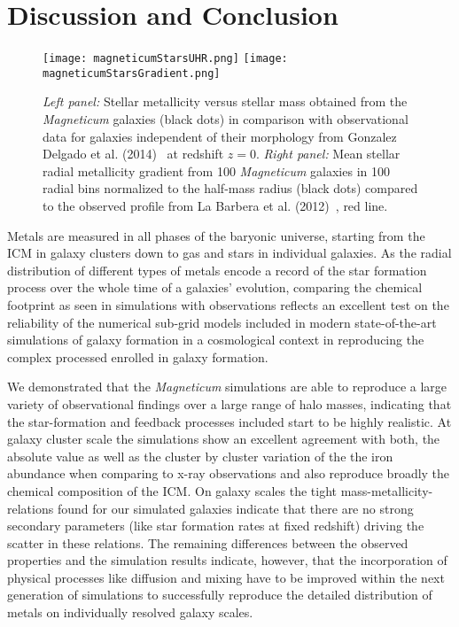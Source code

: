 \documentclass[galaxies,letter,accept,moreauthors,pdftex,10pt,a4paper,usenatbib]{mdpi}
\begin{document}
\section{Discussion and Conclusion}
\begin{figure}[t]
\begin{center}
  \texttt{[image: magneticumStarsUHR.png]}
  \texttt{[image: magneticumStarsGradient.png]}
  \caption{\textit{Left panel:} Stellar metallicity versus stellar
    mass obtained from the {\it Magneticum} galaxies (black dots) in
    comparison with observational data for galaxies independent of
    their morphology from Gonzalez Delgado et al.
    (2014)~\cite{gonzalez14} at redshift $z=0$.  \textit{Right panel:}
    Mean stellar radial metallicity gradient from 100 {\it Magneticum}
    galaxies in 100 radial bins normalized to the half-mass radius
    (black dots) compared to the observed profile from La Barbera et
    al. (2012)~\cite{laBarbera12}, red line.  }
  \label{fig5}
\end{center}
\end{figure}
Metals are measured in all phases of the baryonic universe, starting
from the ICM in galaxy clusters down to gas and stars in individual
galaxies. As the radial distribution of different types of metals
encode a record of the star formation process over the whole time of a
galaxies' evolution, comparing the chemical footprint as seen in
simulations with observations reflects an excellent test on the
reliability of the numerical sub-grid models included in modern
state-of-the-art simulations of galaxy formation in a cosmological
context in reproducing the complex processed enrolled in galaxy
formation.

We demonstrated that the {\it Magneticum} simulations are able to
reproduce a large variety of observational findings over a large range
of halo masses, indicating that the star-formation and feedback
processes included start to be highly realistic. At galaxy cluster
scale the simulations show an excellent agreement with both, the absolute
value as well as the cluster by cluster variation of the the iron abundance
when comparing to x-ray observations and also reproduce broadly the chemical
composition of the ICM. On galaxy scales the tight
mass-metallicity-relations found for our simulated galaxies indicate
that there are no strong secondary parameters (like star formation
rates at fixed redshift) driving the scatter in these relations. The
remaining differences between the observed properties and the
simulation results indicate, however, that the incorporation of
physical processes like diffusion and mixing have to be improved
within the next generation of simulations to successfully reproduce
the detailed distribution of metals on individually resolved galaxy
scales.
\end{document}
